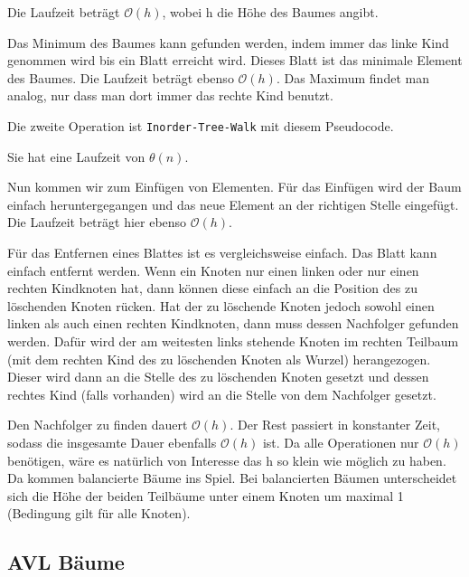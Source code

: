 \documentclass[10pt,a4paper,oneside,ngerman,numbers=noenddot]{scrartcl}
\begin{document}
	Die Laufzeit beträgt $\mathcal{O}(h)$, wobei h die Höhe des Baumes angibt.
	
	Das Minimum des Baumes kann gefunden werden, indem immer das linke Kind genommen wird bis ein Blatt erreicht wird. Dieses Blatt ist das minimale Element des Baumes. Die Laufzeit beträgt ebenso $\mathcal{O}(h)$. Das Maximum findet man analog, nur dass man dort immer das rechte Kind benutzt.
	
	Die zweite Operation ist \texttt{Inorder-Tree-Walk} mit diesem Pseudocode.
	
	\begin{algorithmic}[1]
				\State {}
				\State {}
				\State {}
			\EndIf
		\EndProcedure
	\end{algorithmic}
	
	Sie hat eine Laufzeit von $\theta(n)$.
	
	Nun kommen wir zum Einfügen von Elementen. Für das Einfügen wird der Baum einfach heruntergegangen und das neue Element an der richtigen Stelle eingefügt. Die Laufzeit beträgt hier ebenso $\mathcal{O}(h)$.
	
	Für das Entfernen eines Blattes ist es vergleichsweise einfach. Das Blatt kann einfach entfernt werden. Wenn ein Knoten nur einen linken oder nur einen rechten Kindknoten hat, dann können diese einfach an die Position des zu löschenden Knoten rücken. Hat der zu löschende Knoten jedoch sowohl einen linken als auch einen rechten Kindknoten, dann muss dessen Nachfolger gefunden werden. Dafür wird der am weitesten links stehende Knoten im rechten Teilbaum (mit dem rechten Kind des zu löschenden Knoten als Wurzel) herangezogen. Dieser wird dann an die Stelle des zu löschenden Knoten gesetzt und dessen rechtes Kind (falls vorhanden) wird an die Stelle von dem Nachfolger gesetzt.
	
	Den Nachfolger zu finden dauert $\mathcal{O}(h)$. Der Rest passiert in konstanter Zeit, sodass die insgesamte Dauer ebenfalls $\mathcal{O}(h)$ ist. Da alle Operationen nur $\mathcal{O}(h)$ benötigen, wäre es natürlich von Interesse das h so klein wie möglich zu haben. Da kommen balancierte Bäume ins Spiel. Bei balancierten Bäumen unterscheidet sich die Höhe der beiden Teilbäume unter einem Knoten um maximal 1 (Bedingung gilt für alle Knoten).
	
	\subsection{AVL Bäume}
\end{document}
